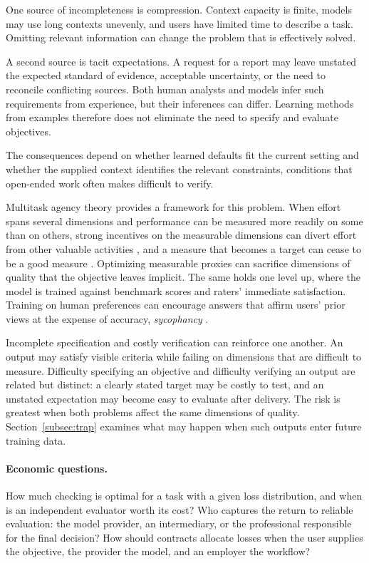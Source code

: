 \documentclass[12pt]{article}
\theoremstyle{plain}
\theoremstyle{definition}
\theoremstyle{remark}
\begin{document}
One source of incompleteness is compression. Context capacity is finite,
models may use long contexts unevenly, and
users have limited time to describe a task. Omitting relevant information
can change the problem that is effectively solved.

A second source is tacit expectations. A request for a report may leave
unstated the expected standard of evidence, acceptable uncertainty, or
the need to reconcile conflicting sources. Both human analysts and
models infer such requirements from experience, but their inferences
can differ. Learning methods from examples therefore does not eliminate
the need to specify and evaluate objectives.

The consequences depend on whether learned defaults fit the current
setting and whether the supplied context identifies the relevant
constraints, conditions that open-ended work often makes difficult to
verify.

Multitask agency theory provides a framework for this problem. When
effort spans several dimensions and performance can be measured more
readily on some than on others, strong incentives on the measurable
dimensions can divert effort from other valuable activities
\citep{HolmstromMilgrom1991}, and a measure that becomes a target can
cease to be a good measure \citep{Goodhart1975}. Optimizing measurable proxies can sacrifice dimensions of quality
that the objective leaves implicit. The same holds
one level up, where the model is trained against benchmark scores and
raters' immediate satisfaction. Training on human preferences can encourage answers that affirm users'
prior views at the expense of accuracy, \emph{sycophancy}
\citep{Sharma2024Sycophancy}.

Incomplete specification and costly verification can reinforce one
another. An output may satisfy visible criteria while failing on
dimensions that are difficult to measure. Difficulty specifying an
objective and difficulty verifying an output are related but distinct:
a clearly stated target may be costly to test, and an unstated
expectation may become easy to evaluate after delivery. The risk is
greatest when both problems affect the same dimensions of quality.
Section~\ref{subsec:trap} examines what may happen when such outputs
enter future training data.

\paragraph{Economic questions.}
How much checking is optimal for a task with a given loss distribution,
and when is an independent evaluator worth its cost? Who captures the
return to reliable evaluation: the model provider, an intermediary, or
the professional responsible for the final decision? How should contracts
allocate losses when the user supplies the objective, the provider the
model, and an employer the workflow?
\end{document}
